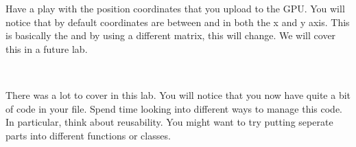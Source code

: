 \documentclass[10pt]{article}
\begin{document}


Have a play with the position coordinates that you upload to the
GPU. You will notice that by default  coordinates
are between  and  in both the x and y axis.
This is basically the  and by using
a different  matrix, this will change. We will cover
this in a future lab.

\

There was a lot to cover in this lab. You will notice that you now have
quite a bit of code in your  file.  Spend time looking into different
ways to manage this code. In particular, think about reusability. You
might want to try putting seperate parts into different functions
or classes.

\end{document}
